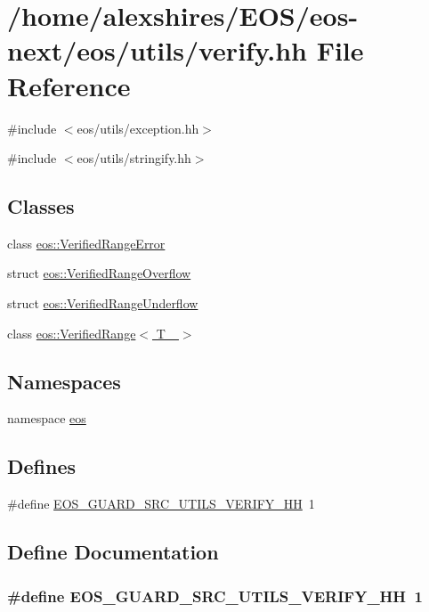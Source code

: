 \hypertarget{verify_8hh}{
\section{/home/alexshires/EOS/eos-\/next/eos/utils/verify.hh File Reference}
\label{verify_8hh}
}
{\ttfamily \#include $<$eos/utils/exception.hh$>$}\par
{\ttfamily \#include $<$eos/utils/stringify.hh$>$}\par
\subsection*{Classes}
\begin{DoxyCompactItemize}
\item 
class \hyperlink{classeos_1_1VerifiedRangeError}{eos::VerifiedRangeError}
\item 
struct \hyperlink{structeos_1_1VerifiedRangeOverflow}{eos::VerifiedRangeOverflow}
\item 
struct \hyperlink{structeos_1_1VerifiedRangeUnderflow}{eos::VerifiedRangeUnderflow}
\item 
class \hyperlink{classeos_1_1VerifiedRange}{eos::VerifiedRange$<$ T\_\- $>$}
\end{DoxyCompactItemize}
\subsection*{Namespaces}
\begin{DoxyCompactItemize}
\item 
namespace \hyperlink{namespaceeos}{eos}
\end{DoxyCompactItemize}
\subsection*{Defines}
\begin{DoxyCompactItemize}
\item 
\#define \hyperlink{verify_8hh_a6d5e2ccc170a563905e127e441a01013}{EOS\_\-GUARD\_\-SRC\_\-UTILS\_\-VERIFY\_\-HH}~1
\end{DoxyCompactItemize}


\subsection{Define Documentation}
\hypertarget{verify_8hh_a6d5e2ccc170a563905e127e441a01013}{
\subsubsection[{EOS\_\-GUARD\_\-SRC\_\-UTILS\_\-VERIFY\_\-HH}]{\setlength{\rightskip}{0pt plus 5cm}\#define EOS\_\-GUARD\_\-SRC\_\-UTILS\_\-VERIFY\_\-HH~1}}
\label{verify_8hh_a6d5e2ccc170a563905e127e441a01013}
